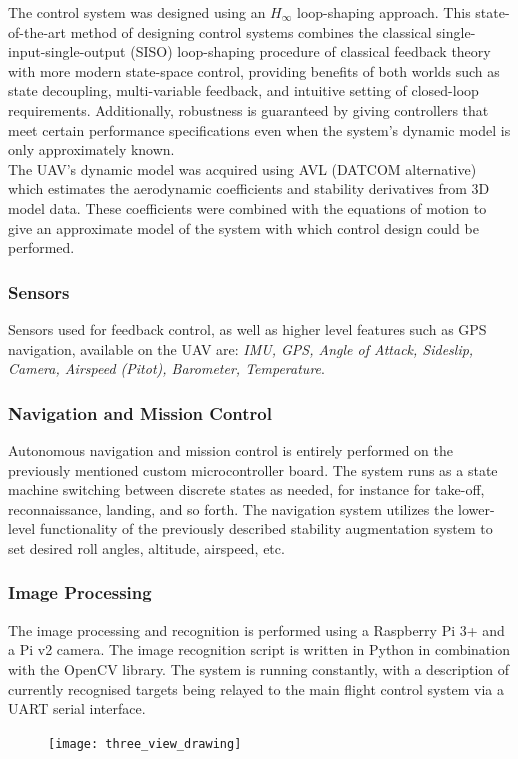 The control system was designed using an $H_{\infty}$ loop-shaping approach. This state-of-the-art method of designing control systems combines the classical single-input-single-output (SISO) loop-shaping procedure of classical feedback theory with more modern state-space control, providing benefits of both worlds such as state decoupling, multi-variable feedback, and intuitive setting of closed-loop requirements. Additionally, robustness is guaranteed by giving controllers that meet certain performance specifications even when the system's dynamic model is only approximately known. \\

The UAV's dynamic model was acquired using AVL (DATCOM alternative) which estimates the aerodynamic coefficients and stability derivatives from 3D model data. These coefficients were combined with the equations of motion to give an approximate model of the system with which control design could be performed. \\

\subsubsection{Sensors}
Sensors used for feedback control, as well as higher level features such as GPS navigation, available on the UAV are: \textit{IMU, GPS, Angle of Attack, Sideslip, Camera, Airspeed (Pitot), Barometer, Temperature}.

\subsubsection{Navigation and Mission Control}
Autonomous navigation and mission control is entirely performed on the previously mentioned custom microcontroller board. The system runs as a state machine switching between discrete states as needed, for instance for take-off, reconnaissance, landing, and so forth. The navigation system utilizes the lower-level functionality of the previously described stability augmentation system to set desired roll angles, altitude, airspeed, etc.

\subsubsection{Image Processing}
The image processing and recognition is performed using a Raspberry Pi 3+ and a Pi v2 camera. The image recognition script is written in Python in combination with the OpenCV library. The system is running constantly, with a description of currently recognised targets being relayed to the main flight control system via a UART serial interface.

\begin{figure}[H]
	\centering
	\texttt{[image: three\_view\_drawing]}
\end{figure}